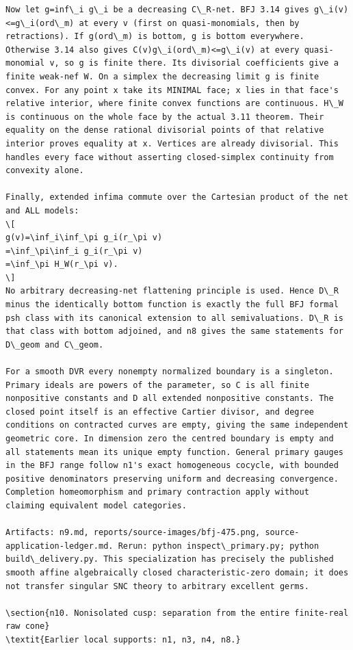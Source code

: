 \documentclass[11pt]{article}
\begin{document}
\begin{Verbatim}[fontsize=\tiny,breaklines=true,breakanywhere=true]
Now let g=inf\_i g\_i be a decreasing C\_R-net. BFJ 3.14 gives g\_i(v)<=g\_i(ord\_m) at every v (first on quasi-monomials, then by retractions). If g(ord\_m) is bottom, g is bottom everywhere. Otherwise 3.14 also gives C(v)g\_i(ord\_m)<=g\_i(v) at every quasi-monomial v, so g is finite there. Its divisorial coefficients give a finite weak-nef W. On a simplex the decreasing limit g is finite convex. For any point x take its MINIMAL face; x lies in that face's relative interior, where finite convex functions are continuous. H\_W is continuous on the whole face by the actual 3.11 theorem. Their equality on the dense rational divisorial points of that relative interior proves equality at x. Vertices are already divisorial. This handles every face without asserting closed-simplex continuity from convexity alone.

Finally, extended infima commute over the Cartesian product of the net and ALL models:
\[
g(v)=\inf_i\inf_\pi g_i(r_\pi v)
=\inf_\pi\inf_i g_i(r_\pi v)
=\inf_\pi H_W(r_\pi v).
\]
No arbitrary decreasing-net flattening principle is used. Hence D\_R minus the identically bottom function is exactly the full BFJ formal psh class with its canonical extension to all semivaluations. D\_R is that class with bottom adjoined, and n8 gives the same statements for D\_geom and C\_geom.

For a smooth DVR every nonempty normalized boundary is a singleton. Primary ideals are powers of the parameter, so C is all finite nonpositive constants and D all extended nonpositive constants. The closed point itself is an effective Cartier divisor, and degree conditions on contracted curves are empty, giving the same independent geometric core. In dimension zero the centred boundary is empty and all statements mean its unique empty function. General primary gauges in the BFJ range follow n1's exact homogeneous cocycle, with bounded positive denominators preserving uniform and decreasing convergence. Completion homeomorphism and primary contraction apply without claiming equivalent model categories.

Artifacts: n9.md, reports/source-images/bfj-475.png, source-application-ledger.md. Rerun: python inspect\_primary.py; python build\_delivery.py. This specialization has precisely the published smooth affine algebraically closed characteristic-zero domain; it does not transfer singular SNC theory to arbitrary excellent germs.

\section{n10. Nonisolated cusp: separation from the entire finite-real raw cone}
\textit{Earlier local supports: n1, n3, n4, n8.}


\end{Verbatim}
\end{document}

